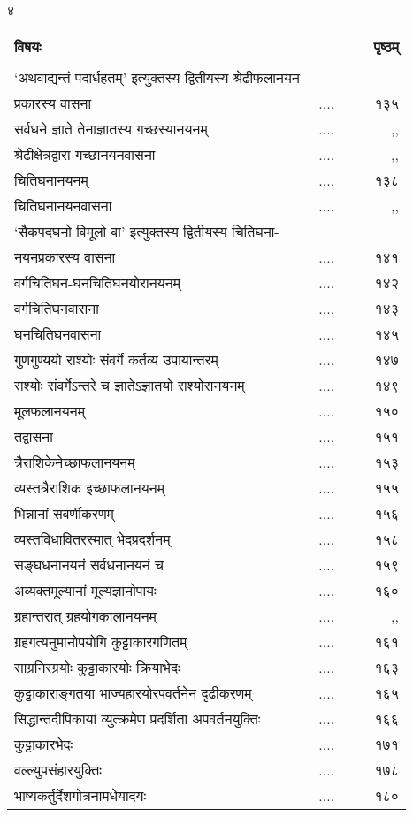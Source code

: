 \documentclass[11pt, openany]{book}
\begin{document}
\begin{center}
४
\end{center}
\vspace{3mm}
\thispagestyle{empty}
\renewcommand{\arraystretch}{1.25}
\begin{tabular}{lp{2cm}p{.2cm}r}
\hspace{1cm} \textbf{विषयः} &&& \textbf{पृष्ठम्} \\
&&&\\ 
`अथवाद्यन्तं पदार्धहतम्' इत्युक्तस्य द्वितीयस्य श्रेढीफलानयन-\\
प्रकारस्य वासना & ....&&~ १३५\\
सर्वधने ज्ञाते तेनाज्ञातस्य गच्छस्यानयनम्  & ....&&~ ,,\\
श्रेढीक्षेत्रद्वारा गच्छानयनवासना & ....&&~ ,,\\
चितिघनानयनम्  & ....&& ~ १३८\\
चितिघनानयनवासना & ....&& ~ ,,\\
`सैकपदघनो विमूलो वा' इत्युक्तस्य द्वितीयस्य चितिघना-\\
नयनप्रकारस्य वासना & ....&&~ १४१\\
वर्गचितिघन-घनचितिघनयोरानयनम्  & ....&&~ १४२\\
वर्गचितिघनवासना  & ....&&~ १४३\\
घनचितिघनवासना & ....&&~ १४५\\
गुणगुण्ययो राश्योः संवर्गे कर्तव्य उपायान्तरम्  & ....&& ~ १४७\\
राश्योः संवर्गेऽन्तरे च ज्ञातेऽज्ञातयो राश्योरानयनम् & ....&&~ १४९\\
मूलफलानयनम् & ....&&~ १५०\\
तद्वासना & ....&&~  १५१\\
त्रैराशिकेनेच्छाफलानयनम्  & ....&&~ १५३\\
व्यस्तत्रैराशिक इच्छाफलानयनम्  & ....&&~ १५५ \\
भिन्नानां सवर्णीकरणम्  & ....&&~ १५६\\
व्यस्तविधावितरस्मात् भेदप्रदर्शनम्  & ....&&~ १५८ \\
सङ्घधनानयनं सर्वधनानयनं च & ....&&~ १५९ \\
अव्यक्तमूल्यानां मूल्यज्ञानोपायः & ....&&~ १६० \\
ग्रहान्तरात् ग्रहयोगकालानयनम्  & ....&&~ ,,\\
ग्रहगत्यनुमानोपयोगि कुट्टाकारगणितम् & ....&&~ १६१\\
साग्रनिरग्रयोः कुट्टाकारयोः क्रियाभेदः  & ....&&~ १६३\\
कुट्टाकाराङ्गतया भाज्यहारयोरपवर्तनेन दृढीकरणम्  & ....&&~ १६५\\
सिद्धान्तदीपिकायां व्युत्क्रमेण प्रदर्शिता अपवर्तनयुक्तिः  & ....&&~ १६६\\
कुट्टाकारभेदः  & ....&& ~ १७१\\
वल्ल्युपसंहारयुक्तिः & ....&& ~ १७८\\
भाष्यकर्तुर्देशगोत्रनामधेयादयः  & ....&&~ १८०\\
\end{tabular}	
\end{document}

